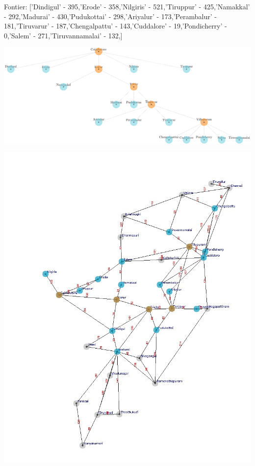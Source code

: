 \documentclass[xcolor=table]{beamer}
\begin{document}
\begin{frame}
  { \tiny Fontier: ['Dindigul' - 395,'Erode' - 358,'Nilgiris' - 521,'Tiruppur' - 425,'Namakkal' - 292,'Madurai' - 430,'Pudukottai' - 298,'Ariyalur' - 173,'Perambalur' - 181,'Tiruvarur' - 187,'Chengalpattu' - 143,'Cuddalore' - 19,'Pondicherry' - 0,'Salem' - 271,'Tiruvannamalai' - 132,]}
  \begin{center}
  \includegraphics[height=0.35\textheight]{../GreedyNode/7-1.png}
  \end{center}
  \begin{center}
    \includegraphics[height=0.55\textheight]{../Greedyoutput/tamilGreedy5.jpg}
  \end{center}
\end{frame}
\end{document}
